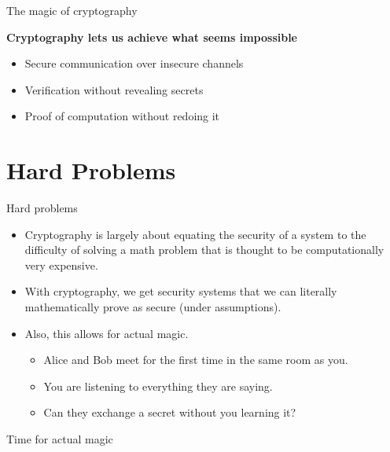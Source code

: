 \documentclass[aspectratio=169, lualatex, handout]{beamer}
\begin{document}
\begin{frame}[c]{The magic of cryptography}
	\begin{center}
		\Large\textbf{Cryptography lets us achieve what seems impossible}
		\vspace{1cm}
		\begin{itemize}[<+->]
			\item Secure communication over insecure channels
			\item Verification without revealing secrets
			\item Proof of computation without redoing it
		\end{itemize}
	\end{center}
\end{frame}

\section{Hard Problems}

\begin{frame}{Hard problems}
	\begin{itemize}[<+->]
		\item Cryptography is largely about equating the security of a system to the
		      difficulty of solving a math problem that is thought to be computationally
		      very expensive.
		\item With cryptography, we get security systems that we can literally
		      mathematically prove as secure (under assumptions).
		\item Also, this allows for actual magic.
		      \begin{itemize}[<+->]
			      \item Alice and Bob meet for the first time in the same room as you.
			      \item You are listening to everything they are saying.
			      \item Can they exchange a secret without you learning it?
		      \end{itemize}
	\end{itemize}
\end{frame}

\begin{frame}{Time for actual magic}
\end{frame}
\end{document}

